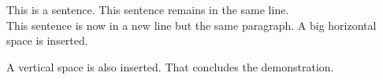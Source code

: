 \documentclass[12pt, a4paper]{article}
\begin{document}
This is a sentence. This sentence remains in the same line. \\This sentence is now in a new line but the same paragraph. \hspace{2cm} A big horizontal space is inserted.

\vspace{5cm} A vertical space is also inserted. That concludes the demonstration.
\end{document}
